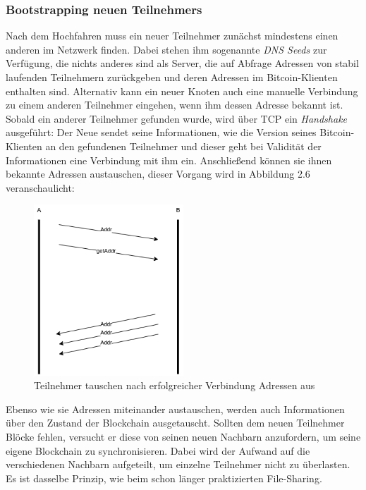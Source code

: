 \subsubsection{Bootstrapping neuen Teilnehmers}
Nach dem Hochfahren muss ein neuer Teilnehmer zunächst mindestens einen anderen im Netzwerk finden. Dabei stehen ihm sogenannte \emph{DNS Seeds} zur Verfügung, die nichts anderes sind als Server, die auf Abfrage Adressen von stabil laufenden Teilnehmern zurückgeben und deren Adressen im Bitcoin-Klienten enthalten sind. 
Alternativ kann ein neuer Knoten auch eine manuelle Verbindung zu einem anderen Teilnehmer eingehen, wenn ihm dessen Adresse bekannt ist.
Sobald ein anderer Teilnehmer gefunden wurde, wird über TCP ein \emph{Handshake} ausgeführt: Der Neue sendet seine Informationen, wie die Version seines Bitcoin-Klienten an den gefundenen Teilnehmer und dieser geht bei Validität der Informationen eine Verbindung mit ihm ein.
Anschließend können sie ihnen bekannte Adressen austauschen, dieser Vorgang wird in Abbildung 2.6 veranschaulicht:
\begin{figure}[htpb]
	\centering
	\includegraphics[width=0.5\textwidth]{images/adress_query.png}
	\caption{Teilnehmer tauschen nach erfolgreicher Verbindung Adressen aus}
	\label{6braun:fig:adress_query}
\end{figure}

Ebenso wie sie Adressen miteinander austauschen, werden auch Informationen über den Zustand der Blockchain ausgetauscht. Sollten dem neuen Teilnehmer Blöcke fehlen, versucht er diese von seinen neuen Nachbarn anzufordern, um seine eigene Blockchain zu synchronisieren. Dabei wird der Aufwand auf die verschiedenen Nachbarn aufgeteilt, um einzelne Teilnehmer nicht zu überlasten. Es ist dasselbe Prinzip, wie beim schon länger praktizierten File-Sharing.
